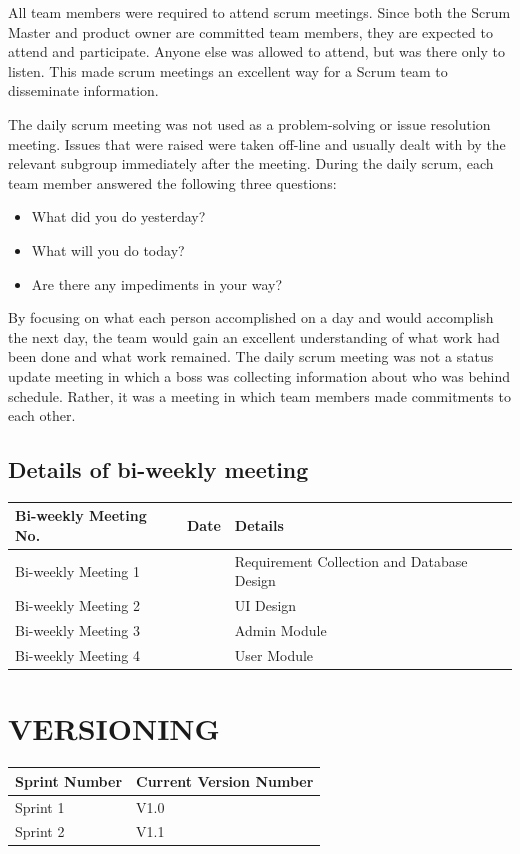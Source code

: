 All team members were required to attend scrum meetings. Since both the Scrum Master and product owner are committed team members, they are expected to attend and participate. Anyone else was allowed to attend, but was there only to listen. This made scrum meetings an excellent way for a Scrum team to disseminate information.

The daily scrum meeting was not used as a problem-solving or issue resolution meeting. Issues that were raised were taken off-line and usually dealt with by the relevant subgroup immediately after the meeting. During the daily scrum, each team member answered the following three questions:
\begin{itemize}
\item
    What did you do yesterday?
\item
    What will you do today?
\item
    Are there any impediments in your way?
\end{itemize}

By focusing on what each person accomplished on a day and would accomplish the next day, the team would gain an excellent understanding of what work had been done and what work remained. The daily scrum meeting was not a status update meeting in which a boss was collecting information about who was behind schedule. Rather, it was a  meeting in which team members made commitments to each other.
%
\section{Details of bi-weekly meeting}
%
%
\renewcommand{\arraystretch}{1.25}
\begin{center}
\begin{tabular}{|p{2cm}|p{1.5cm}|p{8cm}|}
\hline
{\bf Bi-weekly Meeting No.} & {\bf Date} & {\bf Details} \\
\hline
Bi-weekly Meeting 1 & & Requirement Collection and Database Design \\
\hline
Bi-weekly Meeting 2 & & UI Design  \\
\hline
Bi-weekly Meeting 3 & & Admin Module \\
\hline
Bi-weekly Meeting 4 & & User Module \\
\hline
\end{tabular}
\end{center}
\renewcommand{\arraystretch}{1}
%
%
%
%
\chapter{VERSIONING}
%
%
\renewcommand{\arraystretch}{1.25}
\begin{center}
\begin{tabular}{|p{3cm}|p{5cm}|}
\hline
{\bf Sprint Number} & {\bf Current Version Number}\\
\hline
Sprint 1 & V1.0 \\
\hline
Sprint 2 & V1.1 \\
\hline

\end{tabular}
\end{center}
\renewcommand{\arraystretch}{1}
%
%
